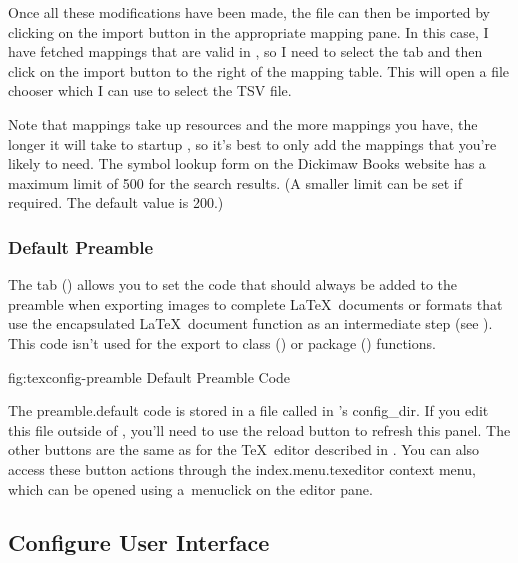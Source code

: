 Once all these modifications have been made, the file can then be
imported by clicking on the import button in the appropriate mapping
pane. In this case, I have fetched mappings that are valid in
\textmode, so I need to select the  tab
and then click on the import button to the right of the mapping
table. This will open a file chooser which I can use to select the
TSV file.

\begin{warning}
Note that mappings take up resources and the more mappings you have,
the longer it will take to startup \FlowframTk, so it's best to only
add the mappings that you're likely to need. The symbol lookup form
on the Dickimaw Books website has a maximum limit of 500 for the search
results. (A smaller limit can be set if required. The default value
is 200.)
\end{warning}

\subsubsection{Default Preamble}\label{sec:texconfigpreamble}


The  tab
() allows you to set the
 code that
should always be added to the preamble when exporting images to
complete \LaTeX\ documents or formats that use the encapsulated
\LaTeX\ document function as an intermediate step (see
). This code isn't used for the export to
class () or package () functions.

\FloatFig
  {fig:texconfig-preamble}
  {}
  {Default Preamble Code}

The \gls{preamble.default} code is stored in a file called
 in \FlowframTk's \gls{config_dir}. If you edit
this file outside of \FlowframTk, you'll need to use the reload
button to refresh this panel. The other buttons are the same as for
the \TeX\ editor described in .  You can
also access these button actions through the
\gls{index.menu.texeditor} context menu, which can be opened using
a~\gls{menuclick} on the editor pane.


\subsection{Configure User Interface}\label{sec:configureuidialog}

